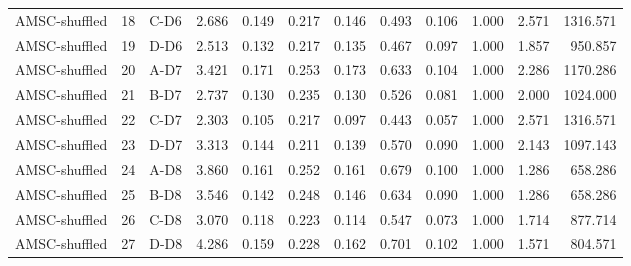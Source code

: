 \begin{table}[ht]
\begin{tabular}{lllrrrrrrrrr}
AMSC-shuffled & 18 & C-D6 & 2.686 & 0.149 & 0.217 & 0.146 & 0.493 & 0.106 & 1.000 & 2.571 & 1316.571 \\
AMSC-shuffled & 19 & D-D6 & 2.513 & 0.132 & 0.217 & 0.135 & 0.467 & 0.097 & 1.000 & 1.857 & 950.857 \\
AMSC-shuffled & 20 & A-D7 & 3.421 & 0.171 & 0.253 & 0.173 & 0.633 & 0.104 & 1.000 & 2.286 & 1170.286 \\
AMSC-shuffled & 21 & B-D7 & 2.737 & 0.130 & 0.235 & 0.130 & 0.526 & 0.081 & 1.000 & 2.000 & 1024.000 \\
AMSC-shuffled & 22 & C-D7 & 2.303 & 0.105 & 0.217 & 0.097 & 0.443 & 0.057 & 1.000 & 2.571 & 1316.571 \\
AMSC-shuffled & 23 & D-D7 & 3.313 & 0.144 & 0.211 & 0.139 & 0.570 & 0.090 & 1.000 & 2.143 & 1097.143 \\
AMSC-shuffled & 24 & A-D8 & 3.860 & 0.161 & 0.252 & 0.161 & 0.679 & 0.100 & 1.000 & 1.286 & 658.286 \\
AMSC-shuffled & 25 & B-D8 & 3.546 & 0.142 & 0.248 & 0.146 & 0.634 & 0.090 & 1.000 & 1.286 & 658.286 \\
AMSC-shuffled & 26 & C-D8 & 3.070 & 0.118 & 0.223 & 0.114 & 0.547 & 0.073 & 1.000 & 1.714 & 877.714 \\
AMSC-shuffled & 27 & D-D8 & 4.286 & 0.159 & 0.228 & 0.162 & 0.701 & 0.102 & 1.000 & 1.571 & 804.571 \\
    \bottomrule
    \end{tabular}
\end{table}
